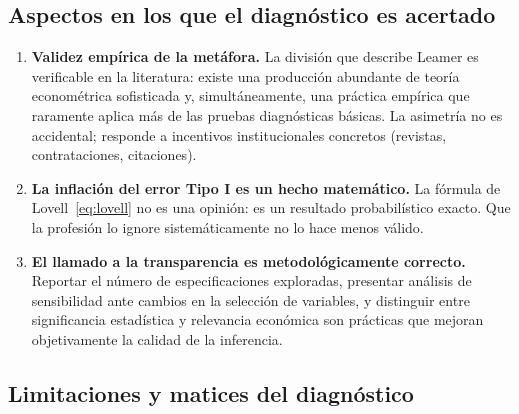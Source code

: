 \documentclass[12pt, letterpaper]{article}
\begin{document}
\subsection{Aspectos en los que el diagnóstico es acertado}

\begin{enumerate}[leftmargin=1.8cm, label=\textbf{\arabic*.}]

  \item \textbf{Validez empírica de la metáfora.} La división que describe
    Leamer es verificable en la literatura: existe una producción abundante
    de teoría econométrica sofisticada y, simultáneamente, una práctica
    empírica que raramente aplica más de las pruebas diagnósticas básicas.
    La asimetría no es accidental; responde a incentivos institucionales
    concretos (revistas, contrataciones, citaciones).

  \item \textbf{La inflación del error Tipo I es un hecho matemático.}
    La fórmula de Lovell~\eqref{eq:lovell} no es una opinión: es un
    resultado probabilístico exacto. Que la profesión lo ignore
    sistemáticamente no lo hace menos válido.

  \item \textbf{El llamado a la transparencia es metodológicamente correcto.}
    Reportar el número de especificaciones exploradas, presentar análisis
    de sensibilidad ante cambios en la selección de variables, y distinguir
    entre significancia estadística y relevancia económica son prácticas
    que mejoran objetivamente la calidad de la inferencia.

\end{enumerate}

\subsection{Limitaciones y matices del diagnóstico}
\end{document}
